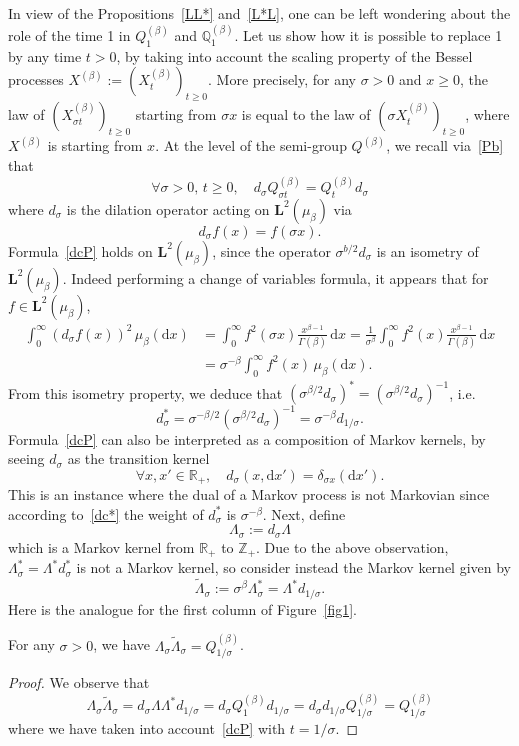 \documentclass[AHL,Unicode,longabstracts]{cedram}
\newcommand{\df}{\mathrel{:=}}
\newcommand{\RR}{\mathbb{R}}
\newcommand{\ZZ}{\mathbb{Z}}
\newcommand{\iy}{\infty}
\newcommand{\wi}{\widetilde}
\newcommand{\dBs}{{\discret{Q}}}
\newcommand{\Bs}{Q}
\newcommand{\esL}{\mathbf{L}}
\newcommand{\discret}[1]{\mathds{#1}}
\newcommand{\cont}[1]{{#1}}
\newcommand{\adjL}{\Lambda^*}
\let\oldforall\forall
\renewcommand*{\forall}{\mathrel{\oldforall}}
\newcommand*{\dd}{\mathrm{d}}
\newcommand*{\dx}{\dd x}
\begin{document}
In view of the Propositions~\ref{LL*} and~\ref{L*L}, one can be left wondering about the role of the time 1 in $\Bs^{(\beta)}_1$ and $\dBs^{(\beta)}_1$. Let us show how it is possible to replace 1 by any time $t>0$, by taking into account the scaling property of the Bessel processes $X^{(\beta)}\df (X_t^{(\beta)})_{t\geq 0}$. More precisely, for any $\sigma>0$ and $x\geq 0$, the law of $(X^{(\beta)}_{\sigma t})_{t\geq 0}$ starting from $\sigma x$ is equal to the law of $(\sigma X^{(\beta)}_t)_{t\geq 0}$, where $X^{(\beta)}$ is starting from $x$. At the level of the semi-group $\Bs^{(\beta)}$, we recall via~\eqref{Pb} that
\begin{equation}\label{dcP}
\forall \sigma>0,\,t\geq 0,\quad d_\sigma\Bs_{\sigma t}^{(\beta)}=\Bs_t^{(\beta)}d_\sigma
\end{equation}
where $d_\sigma$ is the dilation operator acting on $\esL^2(\mu_{\beta})$ via
\[
d_\sigma f (x)=f(\sigma x).
\]
Formula~\eqref{dcP} holds on $\esL^2(\mu_{\beta})$, since the operator $\sigma^{b/2}d_\sigma$ is an isometry of $\esL^2(\mu_{\beta})$. Indeed performing a change of variables formula, it appears that for $f\in
\esL^2(\mu_{\beta})$,
\begin{align*}
\int_0^{\iy} (d_\sigma f(x))^2\,\mu_{\beta}(\dx)&=\int_0^{\iy} f^2(\sigma x)\frac{x^{\beta-1}}{\Gamma(\beta)}\,\dx =\frac{1}{\sigma^{\beta}}\int_0^{\iy} f^2(x)\frac{x^{\beta-1}}{\Gamma(\beta)}\,\dx\\
&=\sigma^{-\beta}\int_0^{\iy} f^2(x)\,\mu_{\beta}(\dx).
\end{align*}
From this isometry property, we deduce that $(\sigma^{\beta/2} d_\sigma)^*=(\sigma^{\beta/2}d_\sigma)^{-1}$, i.e.
\begin{equation}\label{dc*}
\cont{d}^*_{\sigma}=\sigma^{-\beta/2}(\sigma^{\beta/2}d_\sigma)^{-1}=\sigma^{-\beta}\cont{d}_{1/\sigma}.
\end{equation}
Formula~\eqref{dcP} can also be interpreted as a composition of Markov kernels, by seeing $d_\sigma$ as the transition kernel
\[
\forall x,x'\in \RR_+,\quad d_\sigma(x,\dx')=\delta_{\sigma x}(\dx').
\]
This is an instance where the dual of a Markov process is not Markovian since according to~\eqref{dc*} the weight of $d_\sigma^*$ is $\sigma^{-\beta}$. Next, define
\[
\Lambda_{\sigma}\df d_\sigma \Lambda
\]
which is a Markov kernel from $\RR_+$ to $\ZZ_+$. Due to the above observation, $\Lambda_\sigma^*=\Lambda^* d_\sigma^*$ is not a Markov kernel, so consider instead the Markov kernel given by
\[
\wi \Lambda _{\sigma}\df \sigma^{\beta}\Lambda_\sigma^*=\Lambda^* \cont{d}_{1/\sigma}.
\]
Here is the analogue for the first column of Figure~\ref{fig1}.
\begin{lemm}\label{LcLc1}
For any $\sigma>0$, we have $\Lambda_{\sigma}\wi\Lambda_{\sigma}= \Bs_{1/\sigma}^{(\beta)}$.
\end{lemm}
\begin{proof}
We observe that
\[
\Lambda_{\sigma}\wi\Lambda_{\sigma}= d_\sigma \Lambda\adjL \cont{d}_{1/\sigma}=d_\sigma\Bs_1^{(\beta)}\cont{d}_{1/\sigma}=d_\sigma\cont{d}_{1/\sigma}\Bs^{(\beta)}_{1/\sigma}=\Bs^{(\beta)}_{1/\sigma}
\]
where we have taken into account~\eqref{dcP} with $t=1/\sigma$.
\end{proof}
\end{document}
